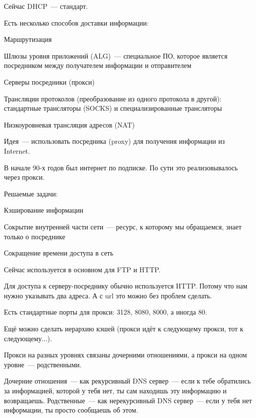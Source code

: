 Сейчас DHCP~--- стандарт.


Есть несколько способов доставки информации:
\begin{MyItemize}
    \item Маршрутизация
    \item Шлюзы уровня приложений (ALG)~--- специальное ПО, которое является посредником между получателем информации и отправителем
    \begin{MyItemize}
        \item Серверы посредники (прокси)
        \item Трансляции протоколов (преобразование из одного протокола в другой): стандартные трансляторы (SOCKS) и специализированные трансляторы
    \end{MyItemize}
    \item [Низкоуровневая] трансляция адресов (NAT)
\end{MyItemize} 


Идея~--- использовать посредника (proxy) для получения информации из Internet.

В начале 90-х годов был интернет по подписке. По сути это реализовывалось через прокси.

Решаемые задачи:
\begin{MyItemize}
    \item Кэширование информации
    \item Сокрытие внутренней части сети~--- ресурс, к которому мы обращаемся, знает только о посреднике
    \item Сокращение времени доступа в сеть
\end{MyItemize}

Сейчас используется в основном для FTP и HTTP.

Для доступа к серверу-посреднику обычно используется HTTP. Потому что нам нужно указывать два адреса. А с url это можно без проблем сделать.

Есть стандартные порты для прокси: 3128, 8080, 8000, а иногда 80.

Ещё можно сделать иерархию кэшей (прокси идёт к следующему прокси, тот к следующему...).

Прокси на разных уровнях связаны дочерними отношениями, а прокси на одном уровне~--- родственными.

Дочерние отношения~--- как рекурсивный DNS сервер~--- если к тебе обратились за информацией, которой у тебя нет, ты сам находишь эту информацию и возвращаешь. Родственные~--- как нерекурсивный DNS сервер~--- если у тебя нет информации, ты просто сообщаешь об этом.


